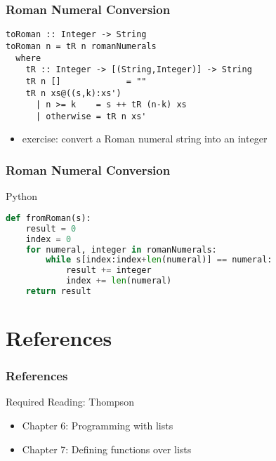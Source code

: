 \documentclass[dvipsnames]{beamer}
\theoremstyle{plain}
\begin{document}
\begin{frame}[fragile]
  \frametitle{Roman Numeral Conversion}

  \begin{exampleblock}{}
    \begin{lstlisting}
toRoman :: Integer -> String
toRoman n = tR n romanNumerals
  where
    tR :: Integer -> [(String,Integer)] -> String
    tR n []             = ""
    tR n xs@((s,k):xs')
      | n >= k    = s ++ tR (n-k) xs
      | otherwise = tR n xs'
    \end{lstlisting}
  \end{exampleblock}

  \pause
  \begin{itemize}
    \item exercise: convert a Roman numeral string into an integer
  \end{itemize}
\end{frame}

\begin{frame}[fragile]
  \frametitle{Roman Numeral Conversion}

  \begin{exampleblock}{Python}
    \begin{lstlisting}[language=python]
def fromRoman(s):
    result = 0
    index = 0
    for numeral, integer in romanNumerals:
        while s[index:index+len(numeral)] == numeral:
            result += integer
            index += len(numeral)
    return result
    \end{lstlisting}
  \end{exampleblock}
\end{frame}

\section*{References}

\begin{frame}
  \frametitle{References}

  \begin{block}{Required Reading: Thompson}
    \begin{itemize}
      \item Chapter 6: \alert{Programming with lists}
      \item Chapter 7: \alert{Defining functions over lists}
    \end{itemize}
  \end{block}
\end{frame}
\end{document}
